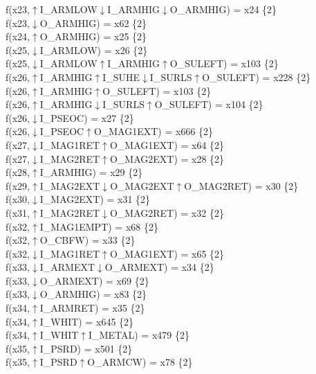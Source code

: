 f(x23,$\uparrow$I\_ARMLOW$\downarrow$I\_ARMHIG$\downarrow$O\_ARMHIG) = x24 \{2\} \\  
f(x23,$\downarrow$O\_ARMHIG) = x62 \{2\} \\  
f(x24,$\uparrow$O\_ARMHIG) = x25 \{2\} \\  
f(x25,$\downarrow$I\_ARMLOW) = x26 \{2\} \\  
f(x25,$\downarrow$I\_ARMLOW$\uparrow$I\_ARMHIG$\uparrow$O\_SULEFT) = x103 \{2\} \\  
f(x26,$\uparrow$I\_ARMHIG$\uparrow$I\_SUHE$\downarrow$I\_SURLS$\uparrow$O\_SULEFT) = x228 \{2\} \\  
f(x26,$\uparrow$I\_ARMHIG$\uparrow$O\_SULEFT) = x103 \{2\} \\  
f(x26,$\uparrow$I\_ARMHIG$\downarrow$I\_SURLS$\uparrow$O\_SULEFT) = x104 \{2\} \\  
f(x26,$\downarrow$I\_PSEOC) = x27 \{2\} \\  
f(x26,$\downarrow$I\_PSEOC$\uparrow$O\_MAG1EXT) = x666 \{2\} \\  
f(x27,$\downarrow$I\_MAG1RET$\uparrow$O\_MAG1EXT) = x64 \{2\} \\  
f(x27,$\downarrow$I\_MAG2RET$\uparrow$O\_MAG2EXT) = x28 \{2\} \\  
f(x28,$\uparrow$I\_ARMHIG) = x29 \{2\} \\  
f(x29,$\uparrow$I\_MAG2EXT$\downarrow$O\_MAG2EXT$\uparrow$O\_MAG2RET) = x30 \{2\} \\  
f(x30,$\downarrow$I\_MAG2EXT) = x31 \{2\} \\  
f(x31,$\uparrow$I\_MAG2RET$\downarrow$O\_MAG2RET) = x32 \{2\} \\  
f(x32,$\uparrow$I\_MAG1EMPT) = x68 \{2\} \\  
f(x32,$\uparrow$O\_CBFW) = x33 \{2\} \\  
f(x32,$\downarrow$I\_MAG1RET$\uparrow$O\_MAG1EXT) = x65 \{2\} \\  
f(x33,$\downarrow$I\_ARMEXT$\downarrow$O\_ARMEXT) = x34 \{2\} \\  
f(x33,$\downarrow$O\_ARMEXT) = x69 \{2\} \\  
f(x33,$\downarrow$O\_ARMHIG) = x83 \{2\} \\  
f(x34,$\uparrow$I\_ARMRET) = x35 \{2\} \\  
f(x34,$\uparrow$I\_WHIT) = x645 \{2\} \\  
f(x34,$\uparrow$I\_WHIT$\uparrow$I\_METAL) = x479 \{2\} \\  
f(x35,$\uparrow$I\_PSRD) = x501 \{2\} \\  
f(x35,$\uparrow$I\_PSRD$\uparrow$O\_ARMCW) = x78 \{2\} \\  
